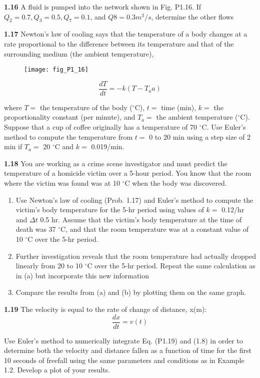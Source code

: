 \documentclass[../main.tex]{subfiles}
\begin{document}
\begin{multicols}{2}
\textbf{1.16} A fluid is pumped into the network shown in Fig. P1.16.
If $Q_2 = 0.7, Q_3 = 0.5, Q_7 = 0.1$, and $Q8 = 0.3 m^3/s$, determine
the other flows


\textbf{1.17} Newton's law of cooling says that the temperature of a
body changes at a rate proportional to the difference between
its temperature and that of the surrounding medium (the ambient temperature),
\begin{figure}[H]
	\centering
	\texttt{[image: fig\_P1\_16]}
   
\end{figure}

$$\dfrac{dT}{dt}= -k(T -T_aa)$$

where $T =$ the temperature of the body ($^{\circ}$C), $t =$ time (min),
$k =$ the proportionality constant (per minute), and $T_a =$ the
ambient temperature ($^{\circ}$C). Suppose that a cup of coffee originally has a temperature of 70 $^{\circ}$C. Use Euler's method to
compute the temperature from $t =$ 0 to 20 min using a step
size of 2 min if $T_a =$ 20 $^{\circ}$C and $k =$ 0.019/min.

\textbf{1.18} You are working as a crime scene investigator and
must predict the temperature of a homicide victim over a
5-hour period. You know that the room where the victim was
found was at 10 $^{\circ}$C when the body was discovered.
\begin{enumerate}[label=(\alph*)]
	\item Use Newton's law of cooling (Prob. 1.17) and Euler's
	method to compute the victim's body temperature for
	the 5-hr period using values of $k=$  0.12/hr and $\Delta t$
	0.5 hr. Assume that the victim's body temperature at
	the time of death was 37 $^{\circ}$C, and that the room temperature was at a constant value of 10 $^{\circ}$C over the 5-hr
	period.
	\item Further investigation reveals that the room temperature
	had actually dropped linearly from 20 to 10 $^{\circ}$C over the
	5-hr period. Repeat the same calculation as in (a) but incorporate this new information
	\item Compare the results from (a) and (b) by plotting them
	on the same graph. 
\end{enumerate}

\textbf{1.19} The velocity is equal to the rate of change of distance,
x(m):
$$\dfrac{dx}{dt} = v(t)$$


Use Euler's method to numerically integrate Eq. (P1.19) and
(1.8) in order to determine both the velocity and distance
fallen as a function of time for the first 10 seconds of freefall
using the same parameters and conditions as in Example 1.2.
Develop a plot of your results.


\end{multicols}
\end{document}
